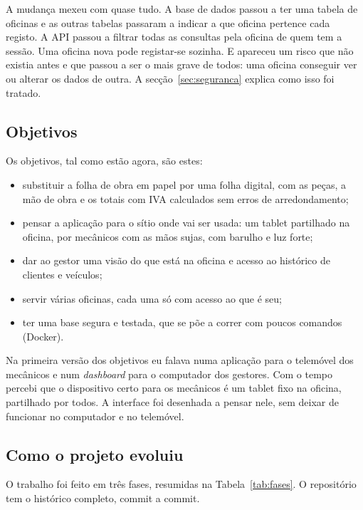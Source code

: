 \documentclass[a4paper,12pt]{article}
\begin{document}
A mudança mexeu com quase tudo. A base de dados passou a ter uma tabela de oficinas e as outras tabelas passaram a indicar a que oficina pertence cada registo. A \ac{API} passou a filtrar todas as consultas pela oficina de quem tem a sessão. Uma oficina nova pode registar-se sozinha. E apareceu um risco que não existia antes e que passou a ser o mais grave de todos: uma oficina conseguir ver ou alterar os dados de outra. A secção~\ref{sec:seguranca} explica como isso foi tratado.

\subsection{Objetivos}

Os objetivos, tal como estão agora, são estes:
\begin{itemize}
    \item substituir a folha de obra em papel por uma folha digital, com as peças, a mão de obra e os totais com \ac{IVA} calculados sem erros de arredondamento;
    \item pensar a aplicação para o sítio onde vai ser usada: um tablet partilhado na oficina, por mecânicos com as mãos sujas, com barulho e luz forte;
    \item dar ao gestor uma visão do que está na oficina e acesso ao histórico de clientes e veículos;
    \item servir várias oficinas, cada uma só com acesso ao que é seu;
    \item ter uma base segura e testada, que se põe a correr com poucos comandos (Docker).
\end{itemize}

Na primeira versão dos objetivos eu falava numa aplicação para o telemóvel dos mecânicos e num \textit{dashboard} para o computador dos gestores. Com o tempo percebi que o dispositivo certo para os mecânicos é um tablet fixo na oficina, partilhado por todos. A interface foi desenhada a pensar nele, sem deixar de funcionar no computador e no telemóvel.

\subsection{Como o projeto evoluiu}

O trabalho foi feito em três fases, resumidas na Tabela~\ref{tab:fases}. O repositório tem o histórico completo, commit a commit.
\end{document}
